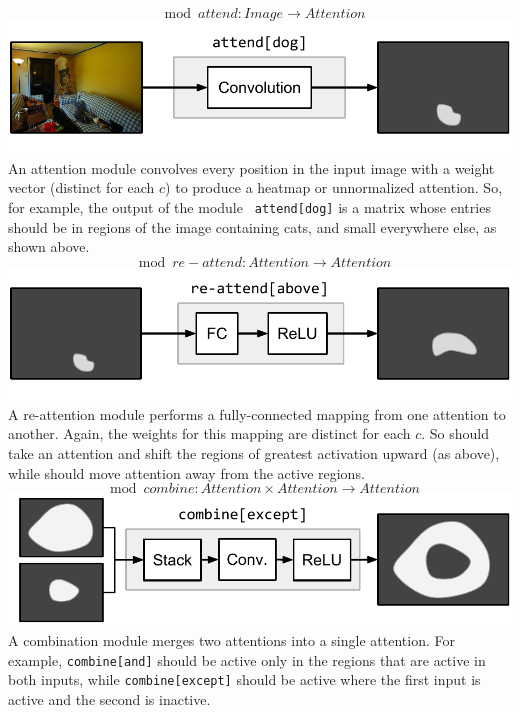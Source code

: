 \[
  \mod{attend} : \mathit{Image} \to \mathit{Attention}
\]
\includegraphics[width=\columnwidth]{fig/attend}
An attention module  convolves every position in the input
image with a weight vector (distinct for each $c$) to produce a heatmap or
unnormalized attention. So, for example, the output of the module {\small\tt
attend[dog]} is a matrix whose entries should be in regions of the image
containing cats, and small everywhere else, as shown above.\\

\[
  \mod{re-attend} : \mathit{Attention} \to \mathit{Attention}
\]
\includegraphics[width=\columnwidth]{fig/re-attend}
A re-attention module  performs a fully-connected mapping
from one attention to another. Again, the weights for this mapping are distinct
for each $c$. So  should take an attention and shift the
regions of greatest activation upward (as above), while 
should move attention away from the active regions.\\%

\[
  \mod{combine} : \mathit{Attention} \times \mathit{Attention} \to
  \mathit{Attention}
\]
\includegraphics[width=\columnwidth]{fig/combine}
A combination module  merges two attentions into a single
attention. For example, {\small\tt combine[and]} should be active only in the
regions that are active in both inputs, while {\small\tt{combine[except]}}
should be active where the first input is active and the second is
inactive.\\[1em] 


